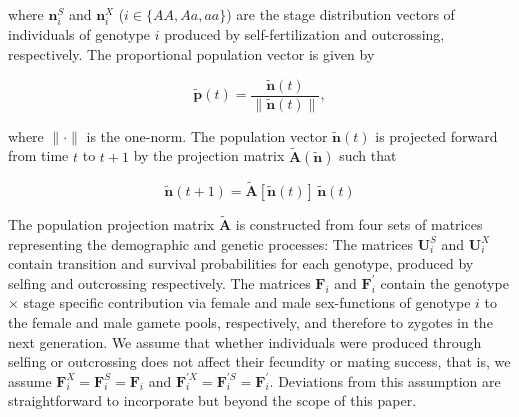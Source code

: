 \documentclass[11pt,draft]{article}
\def\mbf#1{\mathbf{#1}}
\begin{document}
\noindent where $\mbf{n}^{S}_{i}$ and $\mbf{n}^{X}_{i}$ ($i \in \{AA,Aa,aa\}$) are the stage distribution vectors of individuals of genotype $i$ produced by self-fertilization and outcrossing, respectively. The proportional population vector is given by
\begin{linenomath*}
\begin{equation} \label{eq:propPopVec}
	\tilde{\mbf{p}}(t) = \frac{\tilde{\mbf{n}}(t)}{ \| \tilde{\mbf{n}}(t) \|},
\end{equation}
\end{linenomath*}

\noindent where $\| \cdot \|$ is the one-norm. The population vector $\tilde{\mbf{n}}(t)$ is projected forward from time $t$ to $t + 1$ by the projection matrix $\tilde{\mbf{A}}(\tilde{\mbf{n}})$ such that 
\begin{linenomath*}
\begin{equation}
	\tilde{\mbf{n}}(t + 1) = \tilde{\mbf{A}}[\tilde{\mbf{n}}(t)] \, \tilde{\mbf{n}}(t)
\end{equation}
\end{linenomath*}

The population projection matrix $\tilde{\mbf{A}}$ is constructed from four sets of matrices representing the demographic and genetic processes: The matrices $\mbf{U}^{S}_{i}$ and $\mbf{U}^{X}_{i}$ contain transition and survival probabilities for each genotype, produced by selfing and outcrossing respectively. The matrices $\mbf{F}_{i}$ and $\mbf{F}^{\prime}_{i}$ contain the genotype $\times$ stage specific contribution via female and male sex-functions of genotype $i$ to the female and male gamete pools, respectively, and therefore to zygotes in the next generation. We assume that whether individuals were produced through selfing or outcrossing does not affect their fecundity or mating success, that is, we assume  $\mbf{F}^X_{i}=\mbf{F}^S_{i}=\mbf{F}_{i}$ and $\mbf{F}^{\prime X}_{i}=\mbf{F}^{\prime S}_{i}=\mbf{F}^{\prime}_{i}$. Deviations from this assumption are straightforward to incorporate but beyond the scope of this paper. 
\end{document}
